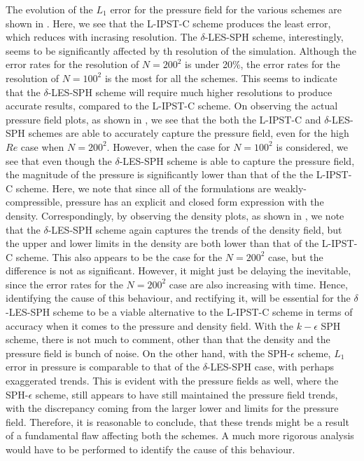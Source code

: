 The evolution of the $L_1$ error for the pressure field for the various schemes are shown in .
Here, we see that the L-IPST-C scheme produces the least error, which reduces with incrasing resolution.
The $\delta$-LES-SPH scheme, interestingly, seems to be significantly affected by th resolution of the simulation. Although the error rates for the resolution of $N=200^2$ is under 20\%, the error rates for the resolution of $N=100^2$ is the most for all the schemes. This seems to indicate that the $\delta$-LES-SPH scheme will require much higher resolutions to produce accurate results, compared to the L-IPST-C scheme.
On observing the actual pressure field plots, as shown in , we see that the both the L-IPST-C and $\delta$-LES-SPH schemes are able to accurately capture the pressure field, even for the high $Re$ case when $N=200^2$. However, when the case for $N=100^2$ is considered, we see that even though the $\delta$-LES-SPH scheme is able to capture the pressure field, the magnitude of the pressure is significantly lower than that of the the L-IPST-C scheme.
Here, we note that since all of the formulations are weakly-compressible, pressure has an explicit and closed form expression with the density.
Correspondingly, by observing the density plots, as shown in , we note that the $\delta$-LES-SPH scheme again captures the trends of the density field, but the upper and lower limits in the density are both lower than that of the L-IPST-C scheme.
This also appears to be the case for the $N=200^2$ case, but the difference is not as significant. However, it might just be delaying the inevitable, since the error rates for the $N=200^2$ case are also increasing with time. Hence, identifying the cause of this behaviour, and rectifying it, will be essential for the $\delta$-LES-SPH scheme to be a viable alternative to the L-IPST-C scheme in terms of accuracy when it comes to the pressure and density field.
With the $k-\epsilon$ SPH scheme, there is not much to comment, other than that the density and the pressure field is bunch of noise.
On the other hand, with the SPH-$\epsilon$ scheme, $L_1$ error in pressure is comparable to that of the $\delta$-LES-SPH case, with perhaps exaggerated trends. This is evident with the pressure fields as well, where the SPH-$\epsilon$ scheme, still appears to have still maintained the pressure field trends, with the discrepancy coming from the larger lower and limits for the pressure field.
Therefore, it is reasonable to conclude, that these trends might be a result of a fundamental flaw affecting both the schemes. A much more rigorous analysis would have to be performed to identify the cause of this behaviour.


